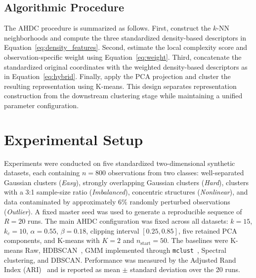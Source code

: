 \documentclass[twoside]{article}
\begin{document}
\subsection{Algorithmic Procedure}
The AHDC procedure is summarized as follows. First, construct the $k$-NN neighborhoods and compute the three standardized density-based descriptors in Equation~\ref{eq:density_features}. Second, estimate the local complexity score and observation-specific weight using Equation~\ref{eq:weight}. Third, concatenate the standardized original coordinates with the weighted density-based descriptors as in Equation~\ref{eq:hybrid}. Finally, apply the PCA projection and cluster the resulting representation using K-means. This design separates representation construction from the downstream clustering stage while maintaining a unified parameter configuration.

\section{Experimental Setup}
Experiments were conducted on five standardized two-dimensional synthetic datasets, each containing $n=800$ observations from two classes: well-separated Gaussian clusters (\textit{Easy}), strongly overlapping Gaussian clusters (\textit{Hard}), clusters with a 3:1 sample-size ratio (\textit{Imbalanced}), concentric structures (\textit{Nonlinear}), and data contaminated by approximately $6\%$ randomly perturbed observations (\textit{Outlier}). A fixed master seed was used to generate a reproducible sequence of $R=20$ runs. The main AHDC configuration was fixed across all datasets: $k=15$, $k_c=10$, $\alpha=0.55$, $\beta=0.18$, clipping interval $[0.25,0.85]$, five retained PCA components, and K-means with $K=2$ and $n_{\mathrm{start}}=50$. The baselines were K-means Raw, HDBSCAN~\cite{Campello2015}, GMM implemented through \texttt{mclust}~\cite{Scrucca2016}, Spectral clustering, and DBSCAN. Performance was measured by the Adjusted Rand Index (ARI)~\cite{Hubert1985} and is reported as mean $\pm$ standard deviation over the 20 runs.
\end{document}
